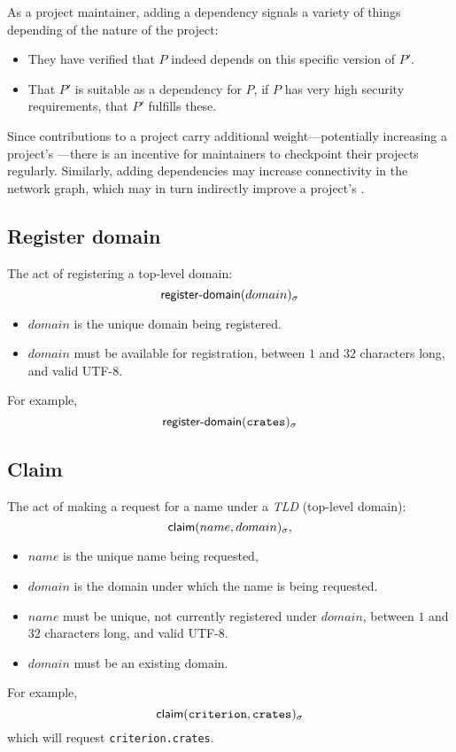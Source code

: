 As a project maintainer, adding a dependency signals a variety of things
depending of the nature of the project:
\begin{itemize}
\item They have verified that $P$ indeed depends on this specific
  version of $P'$.
\item That $P'$ is suitable as a dependency for $P$, \eg{} if $P$ has
  very high security requirements, that $P'$ fulfills these.
\end{itemize}
\noindent Since contributions to a project carry additional
weight---potentially increasing a project's \osrank{}---there is an incentive
for maintainers to checkpoint their projects regularly.  Similarly, adding
dependencies may increase connectivity in the network graph, which may in turn
indirectly improve a project's \osrank{}.

\subsection{Register domain}
The act of registering a top-level domain:
\[
    \mathsf{register\hbox{-}domain}\lparen domain\rparen_\sigma
\]
\begin{itemize}
    \item $domain$ is the unique domain being registered.
\end{itemize}
\validation
\begin{itemize}
    \item $domain$ must be available for registration, between $1$ and $32$
        characters long, and valid UTF-8.
\end{itemize}
For example,
\[
    \mathsf{register\hbox{-}domain}\lparen\mathtt{crates}\rparen_\sigma
\]

\subsection{Claim}
The act of making a request for a name under a \emph{TLD} (top-level domain):
\[
    \mathsf{claim}\lparen name, domain\rparen_\sigma,
\]
\begin{itemize}
    \item $name$ is the unique name being requested,
    \item $domain$ is the domain under which the name is being requested.
\end{itemize}
\validation
\begin{itemize}
    \item $name$ must be unique, \ie not currently registered under $domain$,
        between $1$ and $32$ characters long, and valid UTF-8.
    \item $domain$ must be an existing domain.
\end{itemize}
For example,
\[
    \mathsf{claim}\lparen\mathtt{criterion}, \mathtt{crates}\rparen_\sigma
\]
which will request \texttt{criterion.crates}.

